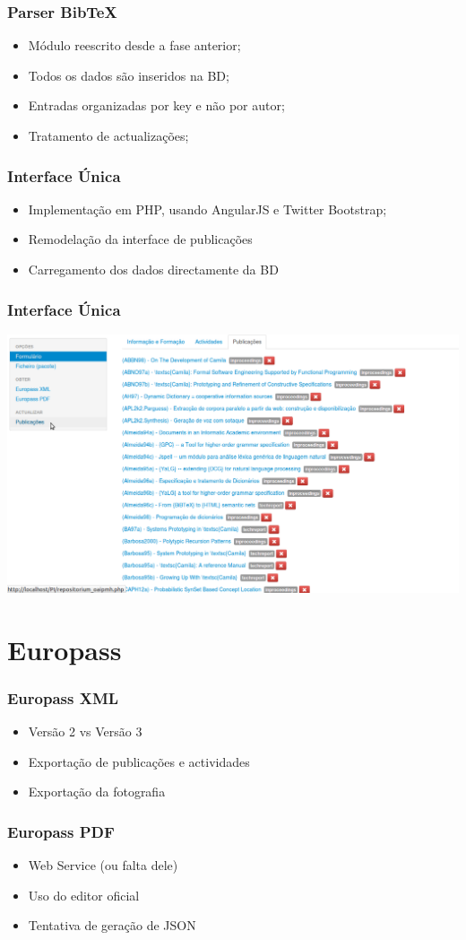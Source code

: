 \documentclass{beamer}
\begin{document}
\begin{frame}
	\frametitle{Parser BibTeX}
	\begin{itemize}
		\item Módulo reescrito desde a fase anterior;
		\item Todos os dados são inseridos na BD;
		\item Entradas organizadas por key e não por autor;
		\item Tratamento de actualizações;		
	\end{itemize}
		
	
\end{frame}

\begin{frame}
	\frametitle{Interface Única}
	\begin{itemize}
		\item Implementação em PHP, usando AngularJS e Twitter Bootstrap;
		\item Remodelação da interface de publicações
		\item Carregamento dos dados directamente da BD
	\end{itemize}
\end{frame}
\begin{frame}
	\frametitle{Interface Única}
	\includegraphics[width=1.2\textwidth]{../iPublications2.png}
\end{frame}

\section{Europass}
\begin{frame}
	\frametitle{Europass XML}
	\begin{itemize}
		\item Versão 2 vs Versão 3
		\item Exportação de publicações e actividades
		\item Exportação da fotografia
	\end{itemize}
\end{frame}
\begin{frame}
	\frametitle{Europass PDF}
	\begin{itemize}
		\item Web Service (ou falta dele)
		\item Uso do editor oficial
		\item Tentativa de geração de JSON
	\end{itemize}
\end{frame}
\end{document}

